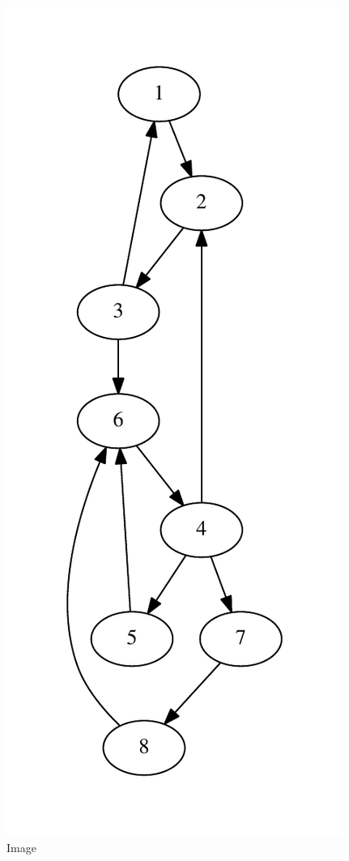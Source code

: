 \documentclass[]{article}
\begin{document}
\begin{figure}[htbp]
\centering
\includegraphics{./Images/oriforte.pdf}
\caption{Image}
\end{figure}
\end{document}
